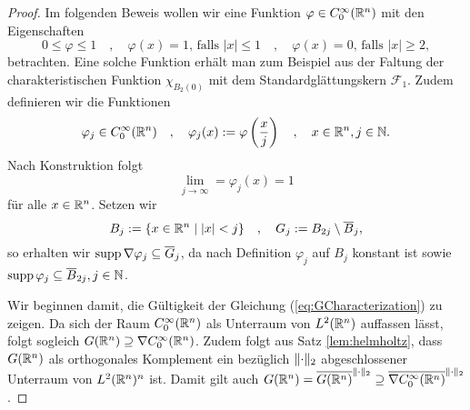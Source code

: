 \begin{proof}
  Im folgenden Beweis wollen wir eine Funktion $\varphi \in C_0^\infty(\mathbb{R}^n)$ mit den Eigenschaften
  \begin{equation}
    \label{eq:propPhi}
  0 \leq \varphi \leq 1
  \quad,\quad
  \varphi(x) = 1 \text{, falls } |x| \leq 1
  \quad,\quad
  \varphi(x) = 0 \text{, falls } |x| \geq 2,
\end{equation}
  betrachten.
  Eine solche Funktion erhält man zum Beispiel aus der Faltung der charakteristischen Funktion $\chi_{B_2(0)}$ mit dem Standardglättungskern $\mathcal{F}_1$.
  Zudem definieren wir die Funktionen
  $$
  \varphi_j \in C_0^\infty(\mathbb{R}^n)
  \quad,\quad
  \varphi_j(x) := \varphi\left(\frac{x}{j}\right)
  \quad,\quad
  x \in \mathbb{R}^n, j \in \mathbb{N}.
  $$
  Nach Konstruktion folgt 
  \begin{equation}
    \label{eq:limPhi}
    \lim_{j \to \infty} = \varphi_j(x) = 1
  \end{equation}
  für alle $x \in \mathbb{R}^n$.
  Setzen wir
  $$
  B_j := \{ x \in \mathbb{R}^n \mid |x| < j \} 
  \quad,\quad
  G_j := B_{2j}\setminus \overline B_j,
  $$
  so erhalten wir $\operatorname{supp} \nabla \varphi_j \subseteq \overline G_j$, da nach Definition $\varphi_j$ auf $B_j$ konstant ist sowie $\operatorname{supp} \varphi_j \subseteq \overline B_{2j}, j \in \mathbb{N}$.

  Wir beginnen damit, die Gültigkeit der Gleichung (\ref{eq:GCharacterization}) zu zeigen.
  Da sich der Raum $C_0^\infty(\mathbb{R}^n)$ als Unterraum von $L^2(\mathbb{R}^n)$ auffassen lässt, folgt sogleich $G(\mathbb{R}^n) \supseteq \nabla C_0^\infty(\mathbb{R}^n)$.
  Zudem folgt aus Satz \ref{lem:helmholtz}, dass $G(\mathbb{R}^n)$ als orthogonales Komplement ein bezüglich $\lVert \cdot \rVert_2$ abgeschlossener Unterraum von $L^2(\mathbb{R}^n)^n$ ist.
  Damit gilt auch $G(\mathbb{R}^n) = \overline{G(\mathbb{R}^n)}^{\lVert \cdot \rVert_2} \supseteq \overline{\nabla C_0^\infty(\mathbb{R}^n)}^{\lVert \cdot \rVert_2}$.


\end{proof}
